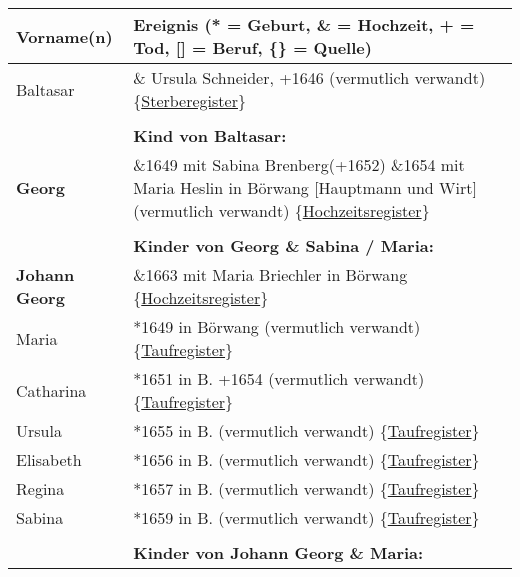 \documentclass[
]{article}
\begin{document}
\begin{longtable}[]{@{}ll@{}}
\toprule\noalign{}
Vorname(n) & Ereignis (* = Geburt, \& = Hochzeit, + = Tod, {[}{]} =
Beruf, \{\} = Quelle) \\
\midrule\noalign{}
\endhead
\bottomrule\noalign{}
\endlastfoot
Baltasar & \& Ursula Schneider, +1646 (vermutlich verwandt)
\{\href{https://data.matricula-online.eu/de/deutschland/augsburg/haldenwang-bei-kempten/1-S/?pg=1}{Sterberegister}\} \\
& \\
& \textbf{Kind von Baltasar:} \\
\textbf{Georg} & \&1649 mit Sabina Brenberg(+1652) \&1654 mit Maria
Heslin in Börwang {[}Hauptmann und Wirt{]} (vermutlich verwandt)
\{\href{https://data.matricula-online.eu/de/deutschland/augsburg/haldenwang-bei-kempten/1-H/?pg=11}{Hochzeitsregister}\} \\
& \\
& \textbf{Kinder von Georg \& Sabina / Maria:} \\
\textbf{Johann Georg} & \&1663 mit Maria Briechler in Börwang
\{\href{https://data.matricula-online.eu/de/deutschland/augsburg/haldenwang-bei-kempten/1-H/?pg=19}{Hochzeitsregister}\} \\
Maria & *1649 in Börwang (vermutlich verwandt)
\{\href{https://data.matricula-online.eu/de/deutschland/augsburg/haldenwang-bei-kempten/1-T-1/?pg=10}{Taufregister}\} \\
Catharina & *1651 in B. +1654 (vermutlich verwandt)
\{\href{https://data.matricula-online.eu/de/deutschland/augsburg/haldenwang-bei-kempten/1-T-1/?pg=25}{Taufregister}\} \\
Ursula & *1655 in B. (vermutlich verwandt)
\{\href{https://data.matricula-online.eu/de/deutschland/augsburg/haldenwang-bei-kempten/1-T-1/?pg=41}{Taufregister}\} \\
Elisabeth & *1656 in B. (vermutlich verwandt)
\{\href{https://data.matricula-online.eu/de/deutschland/augsburg/haldenwang-bei-kempten/1-T-1/?pg=45}{Taufregister}\} \\
Regina & *1657 in B. (vermutlich verwandt)
\{\href{https://data.matricula-online.eu/de/deutschland/augsburg/haldenwang-bei-kempten/1-T-1/?pg=51}{Taufregister}\} \\
Sabina & *1659 in B. (vermutlich verwandt)
\{\href{https://data.matricula-online.eu/de/deutschland/augsburg/haldenwang-bei-kempten/1-T-1/?pg=57}{Taufregister}\} \\
& \\
& \textbf{Kinder von Johann Georg \& Maria:} \\

\end{longtable}
\end{document}
